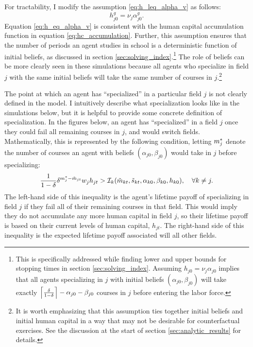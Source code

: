 For tractability, I modify the assumption \eqref{eq:h_leq_alpha_v} as follows:
\begin{equation}\label{eq:h_eq_alpha_v}
    h_{j0}^g = \nu_j \alpha_{j0}^g.
\end{equation}
Equation \eqref{eq:h_eq_alpha_v} is consistent with the human capital accumulation function in equation \eqref{eq:hc_accumulation}. 
Further, this assumption {}ensures that the number of periods an agent studies in school is a deterministic function of initial beliefs, as discussed in section \ref{sec:solving_index}.\footnote{
    This is specifically addressed while finding lower and upper bounds for stopping times in section \ref{sec:solving_index}.
    Assuming $h_{j0} = \nu_j \alpha_{j0}$ implies that all agents specializing in $j$ with initial beliefs $(\alpha_{j0}, \beta_{j0})$ will take exactly $\left\lceil \frac{\delta}{1 - \delta} \right\rceil - \alpha_{j0} - \beta_{j0}$ courses in $j$ before entering the labor force.  
}
The role of beliefs can be more clearly seen in these simulations because all agents who specialize in field $j$ with the same initial beliefs will take the same number of courses in $j$.\footnote{
    It is worth emphasizing that this assumption ties together initial beliefs and initial human capital in a way that may not be desirable for counterfactual exercises. See the discussion at the start of section \ref{sec:analytic_results} for details. 
}


The point at which an agent has ``specialized'' in a particular field $j$ is not clearly defined in the model. 
I intuitively describe what specialization looks like in the simulations below, but it is helpful to provide some concrete definition of specialization. 
In the figures below, an agent has ``specialized'' in a field $j$ once they could fail all remaining courses in $j$, and would switch fields. 
Mathematically, this is represented by the following condition, letting $m_j^*$ denote the number of courses an agent with beliefs $(\alpha_{j0}, \beta_{j0})$ would take in $j$ before specializing:
\begin{equation*}
    \frac{1}{1 - \delta} 
    \delta^{m_j^* - \tilde{m}_{jt}}
    w_j h_{jt}
    >
    \mathcal{I}_{k} (\tilde{m}_{kt}, \tilde{s}_{kt}, \alpha_{k0}, \beta_{k0}, h_{k0}), \quad \forall k \neq j.
\end{equation*}
The left-hand side of this inequality is the agent's lifetime payoff of specializing in field $j$ if they fail all of their remaining courses in that field.
This would imply they do not accumulate any more human capital in field $j$, so their lifetime payoff is based on their current levels of human capital, $h_{jt}$. 
The right-hand side of this inequality is the expected lifetime payoff associated will all other fields. 

